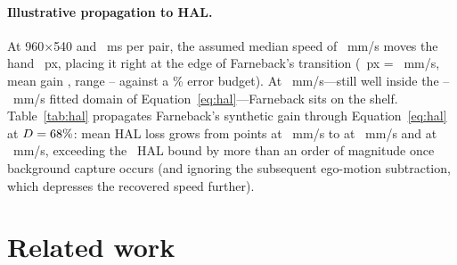 \documentclass[11pt]{article}
\begin{document}
\paragraph{Illustrative propagation to HAL.}
At 960$\times$540 and \cgPairInterval{}~ms per pair, the assumed median speed of
\cgAssumedMedian{}~mm/s moves the hand \cgPxAtMedian{}~px, placing it right at the edge of
Farneback's transition (\cgDispKnee{}~px = \cgSpeedAtKnee{}~mm/s, mean gain \cgGainAtKneeMean{},
range \cgGainAtKneeMin{}--\cgGainAtKneeMax{} against a \cgBudgetPct{}\% error budget). At
\cgSpeedAfter{}~mm/s---still well inside the \cgSpeedLo{}--\cgSpeedHi{}~mm/s fitted domain of
Equation~\eqref{eq:hal}---Farneback sits on the shelf. Table~\ref{tab:hal} propagates Farneback's
synthetic gain through Equation~\eqref{eq:hal} at $D = \cgDutyPricing{}\%$: mean HAL loss grows
from \cgHalLossMeanLo{} points at \cgSpeedRowLo{}~mm/s to \cgHalLossMeanMid{} at
\cgSpeedRowMid{}~mm/s and \cgHalLossMeanHi{} at \cgSpeedRowHi{}~mm/s, exceeding the \cgHalBound{}~HAL
bound by more than an order of magnitude once background capture occurs (and ignoring the
subsequent ego-motion subtraction, which depresses the recovered speed further).

\begin{table}[t]
\centering\small

\caption{Illustrative propagation of Farneback's 960$\times$540 gain through Equation~\eqref{eq:hal}
at $D = \cgDutyPricing{}\%$ (ignoring ego-motion subtraction, which lowers recovered speed further).
This is a sensitivity illustration, not a corpus measurement.}
\label{tab:hal}
\end{table}

\section{Related work}
\label{sec:related}
\end{document}
